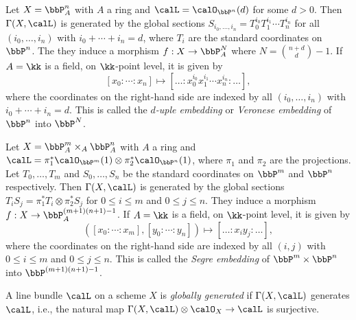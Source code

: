     \begin{example}\label{eg:d-uple_embedding_or_Veronese_embedding}
        Let \(X=\bbP^n_A\) with \(A\) a ring and \(\calL=\calO_{\bbP^n}(d)\) for some \(d>0\).
        Then \(\Gamma(X,\calL)\) is generated by the global sections \(S_{i_0,\ldots,i_n}=T_0^{i_0}T_1^{i_1}\cdots T_n^{i_n}\) for all \((i_0,\ldots,i_n)\) with \(i_0+\cdots+i_n=d\), where \(T_i\) are the standard coordinates on \(\bbP^n\).
        The they induce a morphism \(f:X\to \bbP^N_A\) where \(N=\binom{n+d}{d}-1\).
        If \(A=\kk\) is a field, on \(\kk\)-point level, it is given by
        \[
            [x_0:\cdots:x_n] \mapsto [\ldots:x_0^{i_0}x_1^{i_1}\cdots x_n^{i_n}:\ldots],
        \]
        where the coordinates on the right-hand side are indexed by all \((i_0,\ldots,i_n)\) with \(i_0+\cdots+i_n=d\).
        This is called the \emph{\(d\)-uple embedding} or \emph{Veronese embedding} of \(\bbP^n\) into \(\bbP^N\).
    \end{example}

    \begin{example}\label{eg:Segre_embedding}
        Let \(X=\bbP^m_A \times_A \bbP^n_A\) with \(A\) a ring and \(\calL=\pi_1^*\calO_{\bbP^m}(1) \otimes \pi_2^*\calO_{\bbP^n}(1)\), where \(\pi_1\) and \(\pi_2\) are the projections.
        Let \(T_0,\ldots,T_m\) and \(S_0,\ldots,S_n\) be the standard coordinates on \(\bbP^m\) and \(\bbP^n\) respectively.
        Then \(\Gamma(X,\calL)\) is generated by the global sections \(T_i S_j = \pi_1^*T_i \otimes \pi_2^*S_j\) for \(0\leq i \leq m\) and \(0\leq j \leq n\).
        They induce a morphism \(f:X\to \bbP^{(m+1)(n+1)-1}_A\).
        If \(A=\kk\) is a field, on \(\kk\)-point level, it is given by
        \[ ([x_0:\cdots:x_m],[y_0:\cdots:y_n]) \mapsto [\ldots:x_i y_j:\ldots], \]
        where the coordinates on the right-hand side are indexed by all \((i,j)\) with \(0\leq i \leq m\) and \(0\leq j \leq n\).
        This is called the \emph{Segre embedding} of \(\bbP^m \times \bbP^n\) into \(\bbP^{(m+1)(n+1)-1}\).
    \end{example}


    \begin{definition}\label{def:globally_generated_line_bundle}
        A line bundle \(\calL\) on a scheme \(X\) is \emph{globally generated} if \(\Gamma(X,\calL)\) generates \(\calL\), i.e., the natural map \(\Gamma(X,\calL)\otimes \calO_X \to \calL\) is surjective.
    \end{definition}

